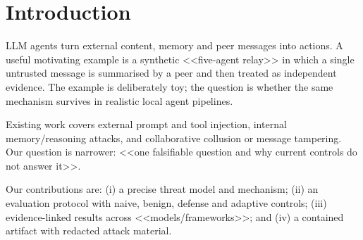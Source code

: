 \section{Introduction}
LLM agents turn external content, memory and peer messages into actions. A useful motivating example is a
synthetic <<five-agent relay>> in which a single untrusted message is summarised by a peer and then treated as
independent evidence. The example is deliberately toy; the question is whether the same mechanism survives in
realistic local agent pipelines.

Existing work covers external prompt and tool injection, internal memory/reasoning attacks, and collaborative
collusion or message tampering. Our question is narrower: <<one falsifiable question and why current controls do
not answer it>>.

Our contributions are: (i) a precise threat model and mechanism; (ii) an evaluation protocol with naive,
benign, defense and adaptive controls; (iii) evidence-linked results across <<models/frameworks>>; and (iv) a
contained artifact with redacted attack material.
